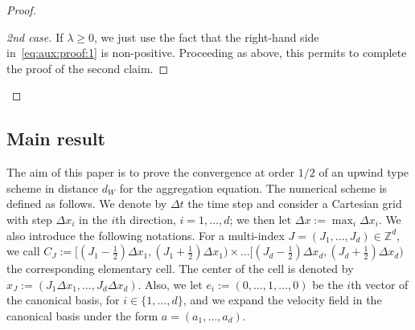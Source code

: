 \documentclass[11pt]{article}
\theoremstyle{definition}
\numberwithin{equation}{section}
\newcommand*\ZZ{\mathbb{Z}}
\newenvironment{laststep}[1]{\begin{proof}[#1]}{\end{proof}}
\begin{document}
\begin{proof}
\begin{laststep}{2nd case}
If $\lambda \geq 0$, we just use the fact that the right-hand side in~\eqref{eq:aux:proof:1} is non-positive. Proceeding as above, this permits to complete the proof of the second claim.
\end{laststep}
\let\qed\relax
\end{proof}


\subsection{Main result}

The aim of this paper is to prove the convergence at order $1/2$ of an upwind type scheme in distance $d_W$ for the aggregation equation. The numerical scheme is defined as follows. We denote by $\Delta t$ the time step and consider a Cartesian grid with step $\Delta x_i$ in the $i$th direction, $i=1,\ldots,d$; we then let $\Delta x:=\max_i \Delta x_i$. We also introduce the following notations. For a multi-index $J=(J_1, \ldots, J_d)\in \ZZ^d$, we call $C_J:=[(J_1-\frac{1}{2})\Delta x_1,(J_1+\frac{1}{2})\Delta x_1)\times \ldots [(J_d-\frac{1}{2})\Delta x_d,(J_d+\frac{1}{2})\Delta x_d)$ the corresponding elementary cell. The center of the cell is denoted by $x_J := (J_1\Delta x_1, \ldots, J_d \Delta x_d).$ Also, we let $e_i := (0,\ldots,1,\ldots,0)$ be the $i$th vector of the canonical basis, for $i \in \{1,\ldots,d\}$, and we expand the velocity field in the canonical basis under the form $a=(a_1,\ldots,a_d)$.
\end{document}
